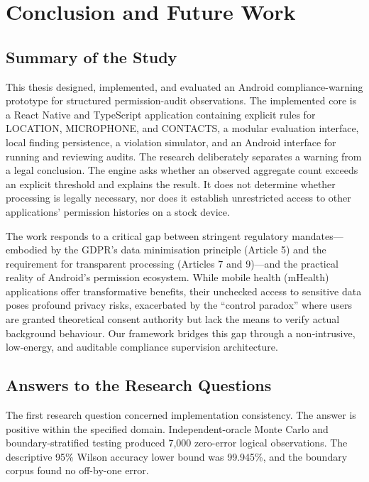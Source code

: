 \newpage
\section{Conclusion and Future Work}

\subsection{Summary of the Study}

This thesis designed, implemented, and evaluated an Android compliance-warning prototype for structured permission-audit observations. The implemented core is a React Native and TypeScript application containing explicit rules for LOCATION, MICROPHONE, and CONTACTS, a modular evaluation interface, local finding persistence, a violation simulator, and an Android interface for running and reviewing audits. The research deliberately separates a warning from a legal conclusion. The engine asks whether an observed aggregate count exceeds an explicit threshold and explains the result. It does not determine whether processing is legally necessary, nor does it establish unrestricted access to other applications' permission histories on a stock device.

The work responds to a critical gap between stringent regulatory mandates—embodied by the GDPR's data minimisation principle (Article 5) and the requirement for transparent processing (Articles 7 and 9)—and the practical reality of Android's permission ecosystem. While mobile health (mHealth) applications offer transformative benefits, their unchecked access to sensitive data poses profound privacy risks, exacerbated by the ``control paradox'' where users are granted theoretical consent authority but lack the means to verify actual background behaviour. Our framework bridges this gap through a non‑intrusive, low‑energy, and auditable compliance supervision architecture.

\subsection{Answers to the Research Questions}

The first research question concerned implementation consistency. The answer is positive within the specified domain. Independent-oracle Monte Carlo and boundary-stratified testing produced 7,000 zero-error logical observations. The descriptive 95\% Wilson accuracy lower bound was 99.945\%, and the boundary corpus found no off-by-one error.

